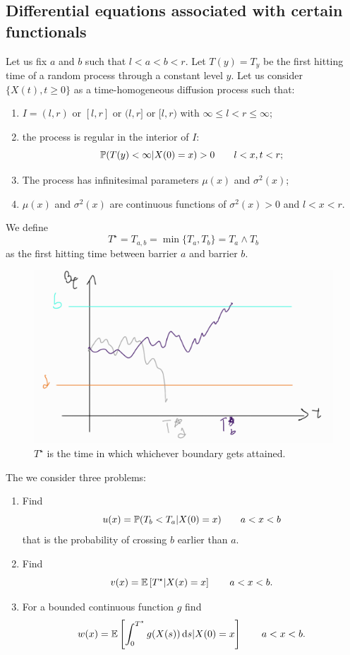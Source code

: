 \documentclass[12pt]{report}
\begin{document}
\subsection{Differential equations associated with certain functionals}
 Let us fix $a$ and $b$ such that $l<a<b<r$. Let $T(y)=T_{y}$ be the first hitting time of a random process through a constant level $y$. Let us consider $\{X(t),t\geq0\}$ as a time-homogeneous diffusion process such that:
\begin{enumerate}
	\item $I=(l,r)$ or $[l,r]$ or $(l,r]$ or $[l,r)$ with $\infty\leq l<r\leq\infty$;
	\item the process is regular in the interior of $I$:
	\begin{equation*}
		\mathbb{P}(T(y)<\infty|X(0)=x)>0\qquad l<x,t<r;
	\end{equation*}
	\item The process has infinitesimal parameters $\mu(x)$ and $\sigma^{2}(x)$;
	\item $\mu(x)$ and $\sigma^{2}(x)$ are continuous functions of $\sigma^{2}(x)>0$ and $l<x<r$.
\end{enumerate}
We define
\begin{equation*}
	T^{\star}=T_{a,b}=\min\{T_{a},T_{b}\}=T_{a}\wedge T_{b}
\end{equation*}
as the first hitting time between barrier $a$ and barrier $b$.
\begin{figure}[H]
	\centering
	\includegraphics[width=0.7\linewidth]{img/screenshot056}
	\caption{$T^\star$ is the time in which whichever boundary gets attained.}
	\label{fig:screenshot056}
\end{figure}
The we consider three problems:
\begin{enumerate}[\circnum]
	\item\label{prob1} Find
	\begin{equation*}
		u(x)=\mathbb{P}(T_{b}<T_{a}|X(0)=x)\qquad a<x<b
	\end{equation*}
	that is the probability of crossing $b$ earlier than $a$.
	\item\label{prob2} Find
	\begin{equation*}
		v(x)=\mathbb{E}\left[T^{\star}|X(x)=x\right]\qquad a<x<b.
	\end{equation*}
	\item\label{prob3} For a bounded continuous function $g$ find
	\begin{equation*}
		w(x)=\mathbb{E}\left[\int_{0}^{T^{\star}}g(X(s))\mathop{}\!\mathrm{d} s|X(0)=x\right]\qquad a<x<b.
	\end{equation*}
\end{enumerate}
\end{document}
